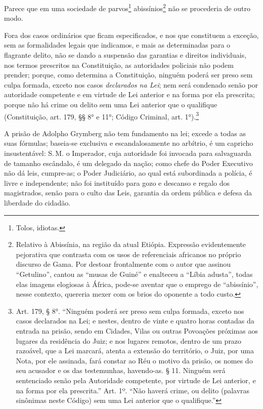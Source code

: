 Parece que em uma sociedade de parvos\footnote{Tolos, idiotas.}
abissínios\footnote{Relativo à Abissínia, na região da atual Etiópia.\label{abissinio}
  Expressão evidentemente pejorativa que contrasta com os usos de
  referenciais africanos no próprio discurso de Gama. Por destoar
  frontalmente com o autor que assinou ``Getulino'', cantou as ``musas de
  Guiné'' e enalteceu a ``Líbia adusta'', todas elas imagens elogiosas à
  África, pode-se aventar que o emprego de ``abissínio'', nesse contexto,
  quereria mexer com os brios do oponente a todo custo.} não se
procederia de outro modo.

Fora dos casos ordinários que ficam especificados, e nos que constituem
a exceção, sem as formalidades legais que indicamos, e mais as
determinadas para o flagrante delito, não se dando a suspensão das
garantias e direitos individuais, nos termos prescritos na Constituição,
as autoridades policiais não podem prender; porque, como determina a
Constituição, ninguém poderá ser preso sem culpa formada, exceto nos
casos \emph{declarados na Lei}; nem será condenado senão por autoridade
competente e em virtude de Lei anterior e na forma por ela prescrita;
porque não há crime ou delito sem uma Lei anterior que o qualifique
(Constituição, art. 179, §§ 8° e 11°; Código Criminal,
art. 1°).\footnote{Art. 179, § 8°. ``Ninguém poderá ser preso sem culpa
  formada, exceto nos casos declarados na Lei; e nestes, dentro de vinte
  e quatro horas contadas da entrada na prisão, sendo em Cidades, Vilas
  ou outras Povoações próximas aos lugares da residência do Juiz; e nos
  lugares remotos, dentro de um prazo razoável, que a Lei marcará,
  atenta a extensão do território, o Juiz, por uma Nota, por ele
  assinada, fará constar ao Réu o motivo da prisão, os nomes do seu
  acusador e os das testemunhas, havendo-as.
  § 11. Ninguém será sentenciado senão pela Autoridade competente, por
  virtude de Lei anterior, e na forma por ela prescrita.''
  Art. 1º. ``Não haverá crime, ou delito (palavras sinônimas neste
  Código) sem uma Lei anterior que o qualifique.''}

A prisão de Adolpho Grymberg não tem fundamento na lei; excede a todas
as suas fórmulas; baseia-se exclusiva e escandalosamente no arbítrio, é
um capricho insustentável: S.\,M. o Imperador, cuja autoridade foi
invocada para salvaguarda de tamanho escândalo, é um delegado da nação;
como chefe do Poder Executivo não dá leis, cumpre-as; o Poder
Judiciário, ao qual está subordinada a polícia, é livre e independente;
não foi instituído para gozo e descanso e regalo dos magistrados, senão
para o culto das Leis, garantia da ordem pública e defesa da liberdade
do cidadão.

